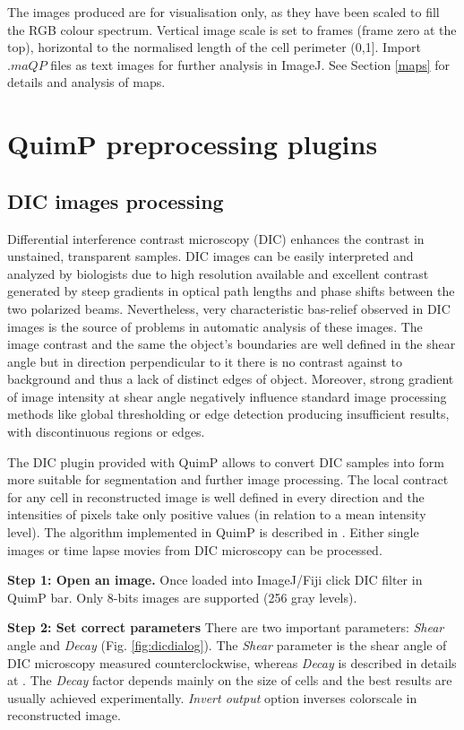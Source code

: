 \documentclass[a4paper,12pt]{article}
\begin{document}
The images produced are for visualisation only, as they have been scaled to fill the RGB colour spectrum.
Vertical image scale is set to frames (frame zero at the top),
horizontal to the normalised length of the cell perimeter (0,1].
Import $.maQP$ files as text images for further analysis in ImageJ. See Section \autoref{maps} for details
and analysis of maps.

\section{QuimP preprocessing plugins}
\label{sec:QuimP_preplugins}
\subsection{DIC images processing}
\label{sec:DIC}

Differential interference contrast microscopy (DIC) enhances the contrast in unstained, transparent samples. DIC images can be easily interpreted and analyzed by biologists due to high resolution available and excellent contrast generated by steep gradients in optical path lengths and phase shifts between the two polarized beams. Nevertheless, very characteristic bas-relief observed in DIC images is the source of problems in automatic analysis of these images. The image contrast and the same the object’s boundaries are well defined in the shear angle but in direction perpendicular to it there is no contrast against to background and thus a lack of distinct edges of object. Moreover, strong gradient of image intensity at shear angle negatively influence standard image processing methods like global thresholding or edge detection producing insufficient results, with discontinuous regions or edges.

The DIC plugin provided with QuimP allows to convert DIC samples into form more suitable for segmentation and further image processing. The local contract for any cell in reconstructed image is well defined in every direction and the intensities of pixels take only positive values (in relation to a mean intensity level). The algorithm implemented in QuimP is described in \cite{Kam1998}. Either single images or time lapse movies from DIC microscopy can be processed. 

\textbf{Step 1: Open an image.}
Once loaded into ImageJ/Fiji click DIC filter in QuimP bar. Only 8-bits images are supported (256 gray levels).

\textbf{Step 2: Set correct parameters}
There are two important parameters: \textit{Shear} angle and \textit{Decay} (Fig. \autoref{fig:dicdialog}). The \textit{Shear} parameter is the shear angle of DIC microscopy measured counterclockwise, whereas \textit{Decay} is described in details at \cite{Kam1998}. The \textit{Decay} factor depends mainly on the size of cells and the best results are usually achieved experimentally. \textit{Invert output} option inverses colorscale in reconstructed image.
\end{document}
